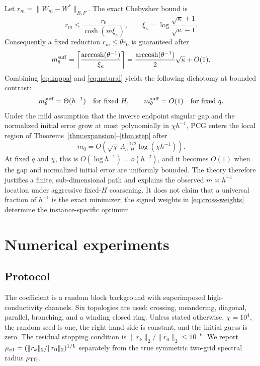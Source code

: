 \documentclass[smallextended]{svjour3}
\newcommand{\norm}[1]{\lVert#1\rVert}
\begin{document}
Let $r_m=\norm{W_m-W^*}_{B,F}$. The exact Chebyshev bound is
\begin{equation}\label{eq:cheb}
 r_m\le\frac{r_0}{\cosh(m\xi_\kappa)},\qquad
 \xi_\kappa=\log\frac{\sqrt\kappa+1}{\sqrt\kappa-1}.
\end{equation}
Consequently a fixed reduction $r_m\le\theta r_0$ is guaranteed after
\begin{equation}\label{eq:natural}
 m_\theta^{\rm suff}=
 \left\lceil\frac{\operatorname{arccosh}(\theta^{-1})}{\xi_\kappa}\right\rceil
 =\frac{\operatorname{arccosh}(\theta^{-1})}{2}\sqrt\kappa+O(1).
\end{equation}
Combining \eqref{eq:kappa} and \eqref{eq:natural} yields the following dichotomy at bounded contrast:
\begin{equation}\label{eq:dichotomy}
 m_\theta^{\rm suff}=\Theta(h^{-1})\quad\text{for fixed }H,
 \qquad m_\theta^{\rm suff}=O(1)\quad\text{for fixed }q.
\end{equation}
Under the mild assumption that the inverse endpoint singular gap and the normalized initial error grow at most polynomially in $\chi h^{-1}$, PCG enters the local region of Theorems~\ref{thm:expansion}--\ref{thm:step} after
\begin{equation}\label{eq:entry}
 m_0=O\!\left(\sqrt\chi\,\Lambda_{h,H}^{-1/2}\log(\chi h^{-1})\right).
\end{equation}
At fixed $q$ and $\chi$, this is $O(\log h^{-1})=o(h^{-2})$, and it becomes $O(1)$ when the gap and normalized initial error are uniformly bounded. The theory therefore justifies a finite, sub-dimensional path and explains the observed $m\asymp h^{-1}$ location under aggressive fixed-$H$ coarsening. It does not claim that a universal fraction of $h^{-1}$ is the exact minimizer; the signed weights in \eqref{eq:cross-weights} determine the instance-specific optimum.

\section{Numerical experiments}\label{sec:numerics}
\subsection{Protocol}
The coefficient is a random block background with superimposed high-conductivity channels. Six topologies are used: crossing, meandering, diagonal, parallel, branching, and a winding closed ring. Unless stated otherwise, $\chi=10^4$, the random seed is one, the right-hand side is constant, and the initial guess is zero. The residual stopping condition is
$\norm{r_k}_2/\norm{r_0}_2\le10^{-6}$. We report
$\rho_{\rm eff}=(\norm{r_k}_2/\norm{r_0}_2)^{1/k}$ separately from the true symmetric two-grid spectral radius $\rho_{\rm TG}$.
\end{document}
